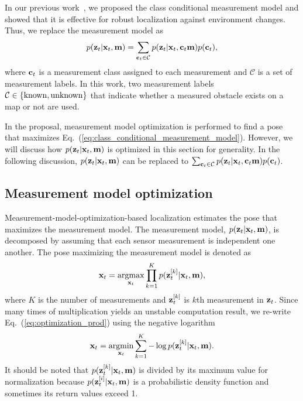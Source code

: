 \documentclass[letterpaper, 10 pt, conference]{ieeeconf}  %
\newcommand{\argmax}{\mathop{\rm argmax}\limits}
\newcommand{\argmin}{\mathop{\rm argmin}\limits}
\begin{document}
In our previous work~\cite{AkaiIROS2018}, we proposed the class conditional measurement model and showed that it is effective for robust localization against environment changes.
Thus, we replace the measurement model as
%
\begin{align}
    p({\bf z}_{t} | {\bf x}_{t}, {\bf m}) = \sum_{{\bf c}_{t} \in \mathcal{C}} p({\bf z}_{t} | {\bf x}_{t}, {\bf c}_{t} {\bf m}) p({\bf c}_{t}),
    \label{eq:class_conditional_measurement_model}
\end{align}
%
where ${\bf c}_{t}$ is a measurement class assigned to each measurement and $\mathcal{C}$ is a set of measurement labels.
In this work, two measurement labels $\mathcal{C} \in \{ {\rm known}, {\rm unknown} \}$ that indicate whether a measured obstacle exists on a map or not are used.

In the proposal, measurement model optimization is performed to find a pose that maximizes Eq.~(\ref{eq:class_conditional_measurement_model}).
However, we will discuss how $p({\bf z}_{t} | {\bf x}_{t}, {\bf m})$ is optimized in this section for generality.
In the following discussion, $p({\bf z}_{t} | {\bf x}_{t}, {\bf m})$ can be replaced to $\sum_{{\bf c}_{t} \in \mathcal{C}} p({\bf z}_{t} | {\bf x}_{t}, {\bf c}_{t} {\bf m}) p({\bf c}_{t})$.



\subsection{Measurement model optimization} 
\label{subsec:measurement_model_optimization}

Measurement-model-optimization-based localization estimates the pose that maximizes the measurement model.
The measurement model, $p({\bf z}_{t} | {\bf x}_{t}, {\bf m})$, is decomposed by assuming that each sensor measurement is independent one another.
The pose maximizing the measurement model is denoted as
%
\begin{align}
    {\bf x}_{t} = \argmax_{{\bf x}_{t}} \prod_{k=1}^{K} p({\bf z}_{t}^{[k]} | {\bf x}_{t}, {\bf m}),
    \label{eq:optimization_prod}
\end{align}
%
where $K$ is the number of measurements and ${\bf z}_{t}^{[k]}$ is $k$th measurement in ${\bf z}_{t}$.
Since many times of multiplication yields an unstable computation result, we re-write Eq.~(\ref{eq:optimization_prod}) using the negative logarithm
%
\begin{align}
    {\bf x}_{t} = \argmin_{{\bf x}_{t}} \sum_{k=1}^{K} -\log p({\bf z}_{t}^{[k]} | {\bf x}_{t}, {\bf m}).
    \label{eq:optimization_sum}
\end{align}
%
It should be noted that $p({\bf z}_{t}^{[k]} | {\bf x}_{t}, {\bf m})$ is divided by its maximum value for normalization because $p({\bf z}_{t}^{[i]} | {\bf x}_{t}, {\bf m})$ is a probabilistic density function and sometimes its return values exceed 1.
\end{document}
